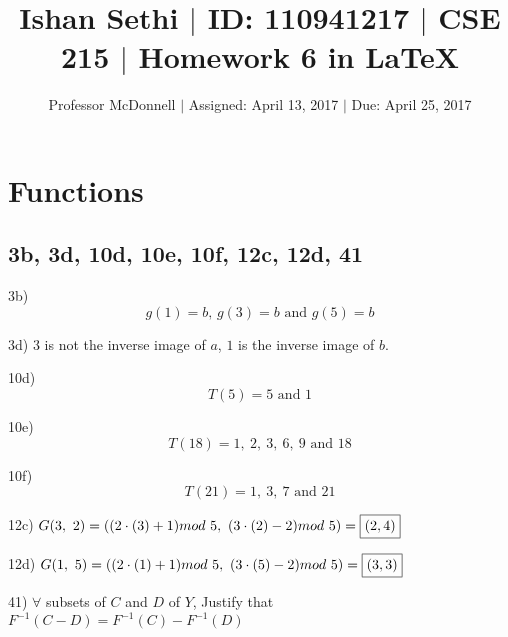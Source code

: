 \documentclass[11pt]{article}
\newcommand*{\mybox}[1]{\framebox{#1}}
\begin{document}
\title{\vspace{-.5in} Ishan Sethi $|$ ID: 110941217 $|$ CSE 215 $|$ Homework 6 in \LaTeX}
\author{Professor McDonnell $|$ Assigned: April 13, 2017 $|$ Due: April 25, 2017}
\date{}
\maketitle
\hrulefill
\tableofcontents

\section{Functions}
\subsection{3b, 3d, 10d, 10e, 10f, 12c, 12d, 41}
\begin{flushleft}

3b) $$g(1) = b\text{, }g(3) = b\text{ and }g(5) =b$$

\vspace{5mm}

3d) $3$ is not the inverse image of $a$, $1$ is the inverse image of $b$.


\hrulefill

10d) $$T(5) = 5\text{ and }1$$

10e) $$T(18) = 1,\  2,\  3,\  6,\  9\text{ and }18$$

10f) $$T(21) = 1,\  3,\  7\text{ and }21$$


\hrulefill

12c) $G(3,\ 2)=((2\cdot(3)+1)mod\ 5,\ (3\cdot  (2)-2)mod\ 5) = \text{\mybox{$ (2,4)$}}$

12d) $G(1,\ 5)=((2\cdot(1)+1)mod\ 5,\ (3\cdot  (5)-2)mod\ 5) = \text{\mybox{$ (3,3)$}}$

\hrulefill

41) $\forall$ subsets of $C$ and $D$ of $Y$, Justify that $F^{-1}(C-D) = F^{-1}(C) - F^{-1}(D)$


\end{flushleft}
\end{document}
